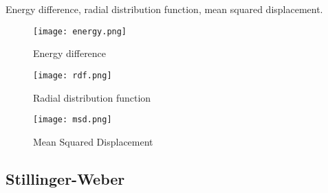 Energy difference, radial distribution function, mean squared displacement.

\begin{figure}[h]
    \centering
    \texttt{[image: energy.png]}
    \caption{Energy difference}
    \label{fig:energy}
\end{figure}

\begin{figure}
    \centering
    \texttt{[image: rdf.png]}
    \caption{Radial distribution function}
    \label{fig:rdf}
\end{figure}

\begin{figure}
    \centering
    \texttt{[image: msd.png]}
    \caption{Mean Squared Displacement}
    \label{fig:msd}
\end{figure}

\subsection{Stillinger-Weber}
